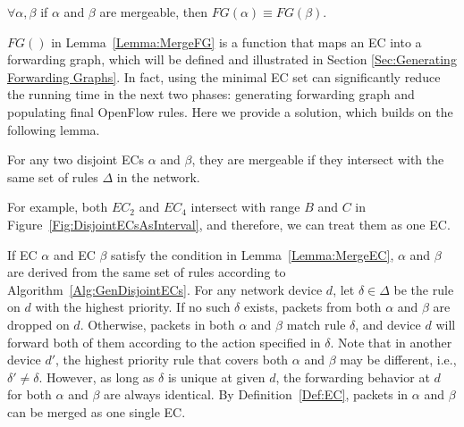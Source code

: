 \begin{lemma}
$\forall \alpha, \beta $ if $\alpha$ and $\beta$ are mergeable, then $FG(\alpha) \equiv FG(\beta)$.
\label{Lemma:MergeFG}
\end{lemma}
$FG()$ in Lemma~\ref{Lemma:MergeFG} is a function that maps an EC into a forwarding graph, which will be defined and illustrated in Section \ref{Sec:Generating Forwarding Graphs}. In fact, using the minimal EC set can significantly reduce the running time in the next two phases: generating forwarding graph and populating final OpenFlow rules. Here we provide a solution, which builds on the following lemma.

\begin{lemma}
For any two disjoint ECs $\alpha$ and $\beta$, they are mergeable
if they intersect with the same set of rules $\Delta$ in the network.
\label{Lemma:MergeEC}
\end{lemma}
For example, both $EC_2$ and $EC_4$ intersect with range $B$ and $C$ in Figure~\ref{Fig:DisjointECsAsInterval}, and therefore, we can treat them as one EC.

If EC $\alpha$ and EC $\beta$ satisfy the condition in Lemma~\ref{Lemma:MergeEC},
$\alpha$ and $\beta$ are derived from the same set of rules according to Algorithm~\ref{Alg:GenDisjointECs}.
For any network device $d$, let $\delta \in \Delta$ be the rule on $d$ with the highest priority.
If no such $\delta$ exists, packets from both $\alpha$ and $\beta$ are dropped on $d$.
Otherwise, packets in both $\alpha$ and $\beta$ match rule $\delta$, and
device $d$ will forward both of them according to the action specified in $\delta$.
Note that in another device $d'$, the highest priority rule that covers both $\alpha$
and $\beta$ may be different, i.e., $\delta' \neq \delta$.
However, as long as $\delta$ is unique at given $d$, the forwarding behavior at $d$ for both $\alpha$ and $\beta$ are always identical.
By Definition~\ref{Def:EC}, packets in $\alpha$ and $\beta$ can be merged as one single EC.

